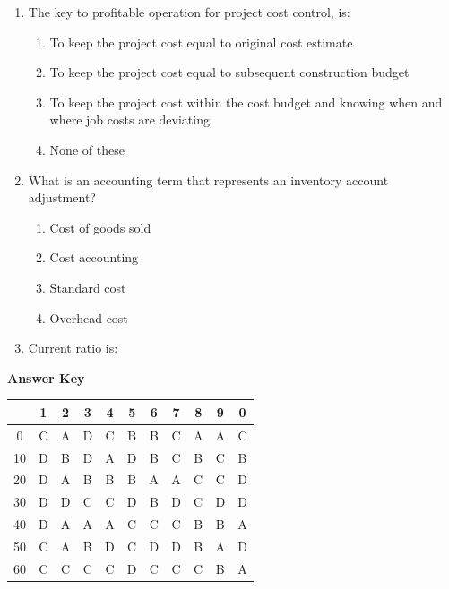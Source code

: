 \documentclass[11pt,a4paper]{article}
\begin{document}
\begin{enumerate}
\\
\item{The key to profitable operation for project cost control, is:}
\begin{enumerate}[label=\Alph*.]
\item{To keep the project cost equal to original cost estimate}
\item{To keep the project cost equal to subsequent construction budget}
\item{To keep the project cost within the cost budget and knowing when and where job costs are deviating}
\item{None of these}
\end{enumerate}
\item{What is an accounting term that represents an inventory account adjustment?}
\begin{enumerate}[label=\Alph*.]
\item{Cost of goods sold}
\item{Cost accounting}
\item{Standard cost}
\item{Overhead cost}
\end{enumerate}
\item{Current ratio is:}
\\
\end{enumerate}
\textbf{Answer Key}
\begin{tabular}{ | c | c c c c c c c c c c | }
\hline
 & 1 & 2 & 3 & 4 & 5 & 6 & 7 & 8 & 9 & 0 \\
\hline
0 & C & A & D & C & B & B & C & A & A & C \\
10 & D & B & D & A & D & B & C & B & C & B \\
20 & D & A & B & B & B & A & A & C & C & D \\
30 & D & D & C & C & D & B & D & C & D & D \\
40 & D & A & A & A & C & C & C & B & B & A \\
50 & C & A & B & D & C & D & D & B & A & D \\
60 & C & C & C & C & D & C & C & C & B & A \\
\hline
\end{tabular}
\clearpage
\end{document}
